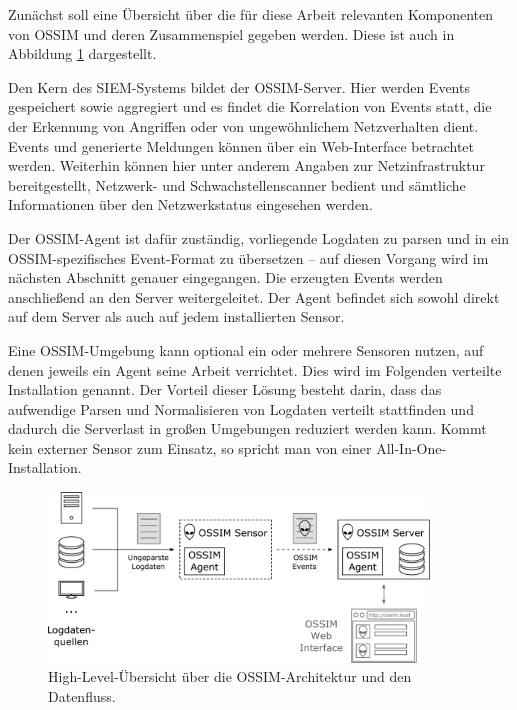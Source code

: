 \label{subsec_state_siem_overview}

Zunächst soll eine Übersicht über die für diese Arbeit relevanten Komponenten von OSSIM und deren Zusammenspiel gegeben werden. Diese ist auch in Abbildung \ref{fig:ossim_log_flow} dargestellt.

Den Kern des SIEM-Systems bildet der OSSIM-Server. Hier werden Events gespeichert sowie aggregiert und es findet die Korrelation von Events statt, die der Erkennung von Angriffen oder von ungewöhnlichem Netzverhalten dient. Events und generierte Meldungen können über ein Web-Interface betrachtet werden. Weiterhin können hier unter anderem Angaben zur Netzinfrastruktur bereitgestellt, Netzwerk- und Schwachstellenscanner bedient und sämtliche Informationen über den Netzwerkstatus eingesehen werden. 

Der OSSIM-Agent ist dafür zuständig, vorliegende Logdaten zu parsen und in ein OSSIM-spezifisches Event-Format zu übersetzen -- auf diesen Vorgang wird im nächsten Abschnitt genauer eingegangen. Die erzeugten Events werden anschließend an den Server weitergeleitet. Der Agent befindet sich sowohl direkt auf dem Server als auch auf jedem installierten Sensor. 

Eine OSSIM-Umgebung kann optional ein oder mehrere Sensoren nutzen, auf denen jeweils ein Agent seine Arbeit verrichtet. Dies wird im Folgenden verteilte Installation genannt. Der Vorteil dieser Lösung besteht darin, dass das aufwendige Parsen und Normalisieren von Logdaten verteilt stattfinden und dadurch die Serverlast in großen Umgebungen reduziert werden kann. Kommt kein externer Sensor zum Einsatz, so spricht man von einer All-In-One-Installation.

\begin{figure}[]
    \centering
        \includegraphics[width=0.9\textwidth]{dia/ossim_log_flow.pdf}
    \caption{High-Level-Übersicht über die OSSIM-Architektur und den Datenfluss.}
    \label{fig:ossim_log_flow}
\end{figure}


